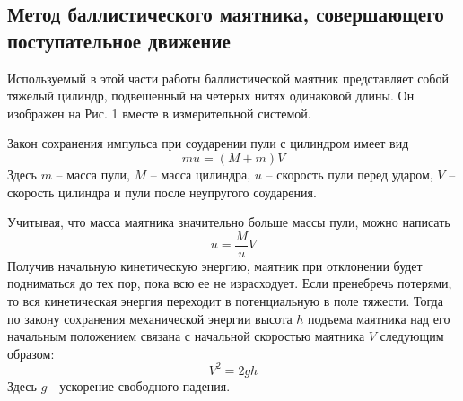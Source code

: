 \documentclass[a4paper,12pt]{article} %
\begin{document}
\subsection{Метод баллистического маятника, совершающего поступательное движение}
Используемый в этой части работы баллистической маятник представляет собой тяжелый цилиндр, подвешенный на четерых нитях одинаковой длины. Он изображен на Рис. 1 вместе в измерительной системой.

Закон сохранения импульса при соударении пули с цилиндром имеет вид
\begin{equation}
mu = (M+m)V
\end{equation}
Здесь $m$ -- масса пули, $M$ -- масса цилиндра, $u$ -- скорость пули перед ударом, $V$ -- скорость цилиндра и пули после неупругого соударения.

Учитывая, что масса маятника значительно больше массы пули, можно написать
\begin{equation}
u = \frac{M}{u}V
\end{equation}
Получив начальную кинетическую энергию, маятник при отклонении будет подниматься до тех пор, пока всю ее не израсходует. Если пренебречь потерями, то вся кинетическая энергия переходит в потенциальную в поле тяжести. Тогда по закону сохранения механической энергии высота $h$ подъема маятника над его начальным положением связана с начальной скоростью маятника $V$ следующим образом:
\begin{equation}
V^2=2gh
\end{equation}
Здесь $g$ - ускорение свободного падения.
\end{document}
